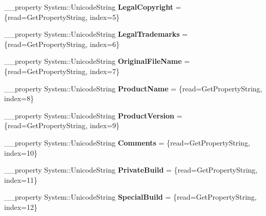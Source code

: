\begin{DoxyCompactItemize}
\item 
\hypertarget{class_versioninfo_1_1_t_version_info_ab0d2a6b6f1bca80d03172843480c9ca1}{\+\_\+\+\_\+property System\+::\+Unicode\+String {\bfseries Legal\+Copyright} = \{read=Get\+Property\+String, index=5\}}\label{class_versioninfo_1_1_t_version_info_ab0d2a6b6f1bca80d03172843480c9ca1}

\item 
\hypertarget{class_versioninfo_1_1_t_version_info_a925688ccef3626cc17231ed9ff4d1d53}{\+\_\+\+\_\+property System\+::\+Unicode\+String {\bfseries Legal\+Trademarks} = \{read=Get\+Property\+String, index=6\}}\label{class_versioninfo_1_1_t_version_info_a925688ccef3626cc17231ed9ff4d1d53}

\item 
\hypertarget{class_versioninfo_1_1_t_version_info_af5eeb6a6462eb3e9ac4924b5afabeaf6}{\+\_\+\+\_\+property System\+::\+Unicode\+String {\bfseries Original\+File\+Name} = \{read=Get\+Property\+String, index=7\}}\label{class_versioninfo_1_1_t_version_info_af5eeb6a6462eb3e9ac4924b5afabeaf6}

\item 
\hypertarget{class_versioninfo_1_1_t_version_info_ae1b4c120b892cb3b6d2535d93b1bf57a}{\+\_\+\+\_\+property System\+::\+Unicode\+String {\bfseries Product\+Name} = \{read=Get\+Property\+String, index=8\}}\label{class_versioninfo_1_1_t_version_info_ae1b4c120b892cb3b6d2535d93b1bf57a}

\item 
\hypertarget{class_versioninfo_1_1_t_version_info_a81093e023e8f11111103ce77a694321f}{\+\_\+\+\_\+property System\+::\+Unicode\+String {\bfseries Product\+Version} = \{read=Get\+Property\+String, index=9\}}\label{class_versioninfo_1_1_t_version_info_a81093e023e8f11111103ce77a694321f}

\item 
\hypertarget{class_versioninfo_1_1_t_version_info_a3cc14c1d8a2c07a10230995d914c677f}{\+\_\+\+\_\+property System\+::\+Unicode\+String {\bfseries Comments} = \{read=Get\+Property\+String, index=10\}}\label{class_versioninfo_1_1_t_version_info_a3cc14c1d8a2c07a10230995d914c677f}

\item 
\hypertarget{class_versioninfo_1_1_t_version_info_ac0dff0c8cdeab135cf04b352f5141295}{\+\_\+\+\_\+property System\+::\+Unicode\+String {\bfseries Private\+Build} = \{read=Get\+Property\+String, index=11\}}\label{class_versioninfo_1_1_t_version_info_ac0dff0c8cdeab135cf04b352f5141295}

\item 
\hypertarget{class_versioninfo_1_1_t_version_info_a7dfe48d840bc3ca7821a68cad3a0bdbb}{\+\_\+\+\_\+property System\+::\+Unicode\+String {\bfseries Special\+Build} = \{read=Get\+Property\+String, index=12\}}\label{class_versioninfo_1_1_t_version_info_a7dfe48d840bc3ca7821a68cad3a0bdbb}


\end{DoxyCompactItemize}
